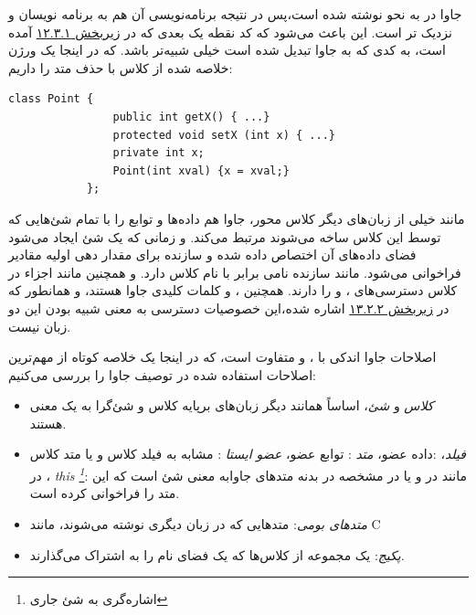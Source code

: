 \documentclass[a4paper,12pt]{report}
\newcommand{\lrm}[1]{\textcolor{steelBlue}{\lr{\texttt{#1}}}}
\begin{document}
 	جاوا در به نحو 
 	نوشته شده است،‌پس در نتیجه برنامه‌نویسی آن هم به برنامه نویسان 
 	 و 
 	نزدیک تر است. این باعث می‌شود که کد نقطه یک بعدی که در 
 	\hyperref[subsec1:sec3:chap12]{
	زیربخش ۱۲.۳.۱} آمده است، به کدی که به جاوا تبدیل شده است خیلی شبیه‌تر باشد. که در اینجا یک ورژن خلاصه شده از کلاس با حذف متد 
 	را داریم:
 		
	\begin{latin}
		\small
		\begin{lstlisting}[]
			class Point {
				public int getX() { ...}
				protected void setX (int x) { ...}
				private int x;
				Point(int xval) {x = xval;}
			};		
		\end{lstlisting}
	\end{latin}	
			
	مانند خیلی از زبان‌های دیگر کلاس محور، جاوا هم داده‌ها و توابع را با تمام شئ‌هایی که توسط این کلاس ساخه می‌شوند مرتبط می‌کند. و زمانی که یک شئ ایجاد می‌شود فضای داده‌های آن اختصاص داده شده و سازنده برای مقدار دهی اولیه مقادیر فراخوانی می‌شود. مانند 
	سازنده نامی برابر با نام  کلاس دارد. و همچنین مانند 
	اجزاء در کلاس 
	 ‌دسترسی‌های
	،  و 
	 را دارند.
	  همچنین
	،  و 
		کلمات کلیدی جاوا هستند، و همانطور که در 
	\linebreak\hyperref[subsec2:sec2:chap13]{زیربخش ۱۳.۲.۲} 
اشاره شده،‌این خصوصیات دسترسی به معنی شبیه بودن این دو زبان نیست.

	اصلاحات جاوا اندکی با
	،  و 
	متفاوت است، که در اینجا یک خلاصه کوتاه از مهم‌ترین اصلاحات استفاده شده در توصیف جاوا را بررسی می‌کنیم:
	
	
	\begin{itemize}[nosep]
		\renewcommand{\labelitemi}{\color{gray}\scriptsize$\blacksquare$}
		\item \textit{
		کلاس} و \textit{شئ}، اساساً همانند دیگر زبان‌های برپایه کلاس و شئ‌گرا به یک معنی هستند.
		
		\item \textit{
		فیلد}،
		:داده عضو،
		\textit{
		متد
		}: توابع عضو، 
		\textit{
		عضو ایستا
		}
		: مشابه به فیلد کلاس و یا متد کلاس در 
		 ،
		\textit{
		this \footnote{
		اشاره‌گری به شئ جاری}}: مانند 
		\lrm{this} در  
		و یا 
		\lrm{self} در  
		مشخصه
		 \lrm{this}
		  در بدنه متد‌های جاوابه معنی شئ است که این متد را فراخوانی کرده است.
		\item \textit{
		متدهای بومی}: متدهایی که در زبان دیگری نوشته می‌شوند، مانند C
		\item \textit{
		پکیج‌}: یک مجموعه از کلاس‌ها که یک فضای نام را به اشتراک می‌گذارند.
	\end{itemize}
\end{document}
